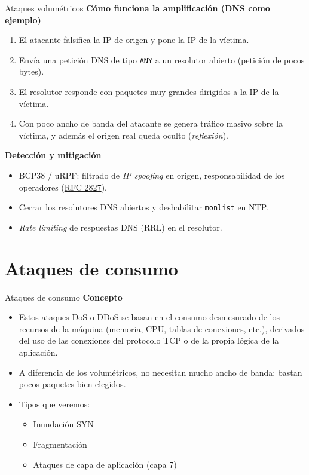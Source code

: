 \documentclass[aspectratio=169,11pt]{beamer}
\newcommand{\cmd}[1]{\texttt{\color{uznavy}#1}}
\newcommand{\subt}[1]{{\color{uznavy}\bfseries #1}\par\smallskip}
\begin{document}
\begin{frame}[allowframebreaks]{Ataques volumétricos}
\small
\subt{Cómo funciona la amplificación (DNS como ejemplo)}
  \begin{enumerate}
  \item El atacante falsifica la IP de origen y pone la IP de la víctima.
  \item Envía una petición DNS de tipo \cmd{ANY} a un resolutor abierto (petición de pocos bytes).
  \item El resolutor responde con paquetes muy grandes dirigidos a la IP de la víctima.
  \item Con poco ancho de banda del atacante se genera tráfico masivo sobre la víctima, y además el origen real queda oculto (\emph{reflexión}).
  \end{enumerate}
\medskip
\subt{Detección y mitigación}
  \begin{itemize}
  \item BCP38 / uRPF: filtrado de \emph{IP spoofing} en origen, responsabilidad de los operadores (\href{https://datatracker.ietf.org/doc/html/rfc2827}{RFC 2827}).
  \item Cerrar los resolutores DNS abiertos y deshabilitar \cmd{monlist} en NTP.
  \item \emph{Rate limiting} de respuestas DNS (RRL) en el resolutor.
  \end{itemize}
\end{frame}


\section{Ataques de consumo}

\begin{frame}[allowframebreaks]{Ataques de consumo}
\small
\subt{Concepto}
  \begin{itemize}
  \item Estos ataques DoS o DDoS se basan en el consumo desmesurado de los recursos de la máquina (memoria, CPU, tablas de conexiones, etc.), derivados del uso de las conexiones del protocolo TCP o de la propia lógica de la aplicación.
  \item A diferencia de los volumétricos, no necesitan mucho ancho de banda: bastan pocos paquetes bien elegidos.
  \item Tipos que veremos:
    \begin{itemize}
    \item Inundación SYN
    \item Fragmentación
    \item Ataques de capa de aplicación (capa 7)
    \end{itemize}
  \end{itemize}
\end{frame}
\end{document}
